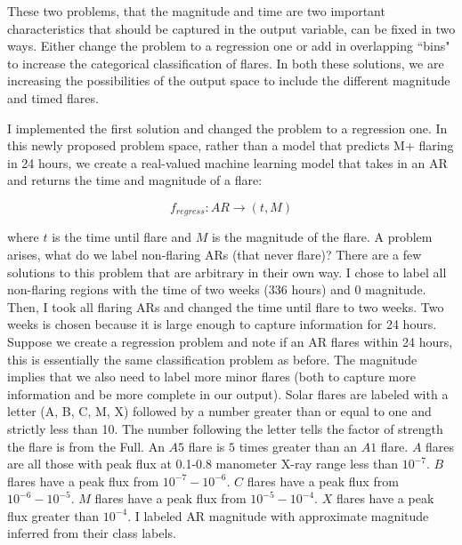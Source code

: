 These two problems, that the magnitude and time are two important characteristics that should be captured in the output variable, can be fixed in two ways. Either change the problem to a regression one or add in overlapping ``bins" to increase the categorical classification of flares. In both these solutions, we are increasing the possibilities of the output space to include the different magnitude and timed flares. 

I implemented the first solution and changed the problem to a regression one. In this newly proposed problem space, rather than a model that predicts M+ flaring in 24 hours, we create a real-valued machine learning model that takes in an AR and returns the time and magnitude of a flare:

$$f_{regress} : AR \rightarrow (t, M)$$

\noindent where $t$ is the time until flare and $M$ is the magnitude of the flare. A problem arises, what do we label non-flaring ARs (that never flare)? There are a few solutions to this problem that are arbitrary in their own way. I chose to label all non-flaring regions with the time of two weeks (336 hours) and 0 magnitude. Then, I took all flaring ARs and changed the time until flare to two weeks. Two weeks is chosen because it is large enough to capture information for 24 hours. Suppose we create a regression problem and note if an AR flares within 24 hours, this is essentially the same classification problem as before. The magnitude implies that we also need to label more minor flares (both to capture more information and be more complete in our output). Solar flares are labeled with a letter (A, B, C, M, X) followed by a number greater than or equal to one and strictly less than 10. The number following the letter tells the factor of strength the flare is from the Full. An $A5$ flare is $5$ times greater than an $A1$ flare. $A$ flares are all those with peak flux at 0.1-0.8 manometer X-ray range less than $10^{-7}$. $B$ flares have a peak flux from $10^{-7}-10^{-6}$. $C$ flares have a peak flux from $10^{-6}-10^{-5}$. $M$ flares have a peak flux from $10^{-5}-10^{-4}$. $X$ flares have a peak flux greater than $10^{-4}$. I labeled AR magnitude with approximate magnitude inferred from their class labels. 


